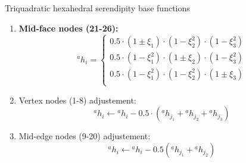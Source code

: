 \documentclass[aspectratio=169]{beamer}
\begin{document}
\begin{frame}{Triquadratic hexahedral serendipity base functions}
    \begin{enumerate}
        \item[4.] {\color{brown}\textbf{Mid-face nodes (21-26):}}
              \vspace{-.2cm}
              \[
                  {}^ah_i = \begin{cases}
                      0.5 \cdot (1 \pm \xi_1) \cdot (1 - \xi_2^2) \cdot (1 - \xi_3^2) \\
                      0.5 \cdot (1 - \xi_1^2) \cdot (1 \pm \xi_2) \cdot (1 - \xi_3^2) \\
                      0.5 \cdot (1 - \xi_1^2) \cdot (1 - \xi_2^2) \cdot (1 \pm \xi_3) \\
                  \end{cases}
              \]
              \vspace{-.5cm}
        \item[5.] Vertex nodes (1-8) adjustement:
              \vspace{-.2cm}
              \[
                  {}^ah_i \leftarrow {}^ah_i - 0.5 \cdot ({}^ah_{j_1} + {}^ah_{j_2}+{}^ah_{j_3})
              \]
              \vspace{-.7cm}
        \item[6.] Mid-edge nodes (9-20) adjustement:
              \vspace{-.2cm}
              \[
                  {}^ah_i \leftarrow{}^ah_i - 0.5 ({}^ah_{j_1} + {}^ah_{j_2})
              \]
    \end{enumerate}
\end{frame}
\end{document}
